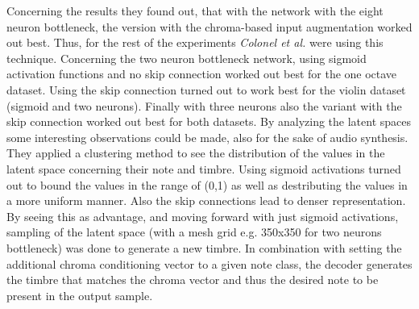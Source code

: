 Concerning the results they found out, that with the network with the eight neuron bottleneck, the version with the chroma-based input augmentation worked out best. Thus, for the rest of the experiments \textit{Colonel et al.} were using this technique. Concerning the two neuron bottleneck network, using sigmoid activation functions and no skip connection worked out best for the one octave dataset. Using the skip connection turned out to work best for the violin dataset (sigmoid and two neurons). Finally with three neurons also the variant with the skip connection worked out best for both datasets. By analyzing the latent spaces some interesting observations could be made, also for the sake of audio synthesis. They applied a clustering method to see the distribution of the values in the latent space concerning their note and timbre. Using sigmoid activations turned out to bound the values in the range of (0,1) as well as destributing the values in a more uniform manner. Also the skip connections lead to denser representation. By seeing this as advantage, and moving forward with just sigmoid activations, sampling of the latent space (with a mesh grid e.g. 350x350 for two neurons bottleneck) was done to generate a new timbre. In combination with setting the additional chroma conditioning vector to a given note class, the decoder generates the timbre that matches the chroma vector and thus the desired note to be present in the output sample.\\


